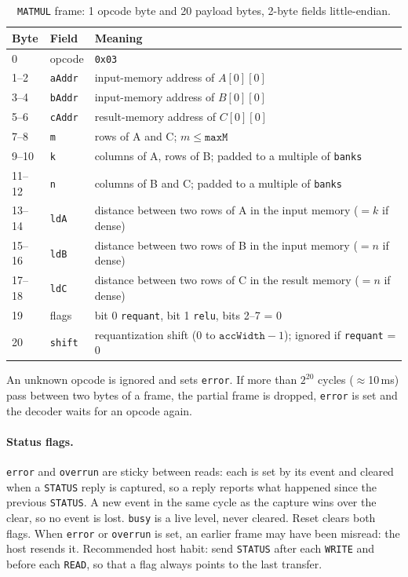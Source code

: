 \documentclass{article}
\begin{document}
\begin{table}[h]
\small\renewcommand{\arraystretch}{1.2}
\begin{tabularx}{\linewidth}{@{} l l Y @{}}
  \toprule
  \textbf{Byte} & \textbf{Field} & \textbf{Meaning} \\
        & opcode & \texttt{0x03} \\
  1--2   & \texttt{aAddr} & input-memory address of $A[0][0]$ \\
  3--4   & \texttt{bAddr} & input-memory address of $B[0][0]$ \\
  5--6   & \texttt{cAddr} & result-memory address of $C[0][0]$ \\
  7--8   & \texttt{m}     & rows of A and C; $m \le \texttt{maxM}$ \\
  9--10  & \texttt{k}     & columns of A, rows of B; padded to a multiple of \texttt{banks} \\
  11--12 & \texttt{n}     & columns of B and C; padded to a multiple of \texttt{banks} \\
  13--14 & \texttt{ldA}   & distance between two rows of A in the input memory ($= k$ if dense) \\
  15--16 & \texttt{ldB}   & distance between two rows of B in the input memory ($= n$ if dense) \\
  17--18 & \texttt{ldC}   & distance between two rows of C in the result memory ($= n$ if dense) \\
  19     & flags          & bit 0 \texttt{requant}, bit 1 \texttt{relu}, bits 2--7 = 0 \\
  20     & \texttt{shift} & requantization shift ($0$ to $\texttt{accWidth}-1$); ignored if \texttt{requant} = 0 \\
  \bottomrule
\end{tabularx}
\caption{\texttt{MATMUL} frame: 1 opcode byte and 20 payload bytes, 2-byte fields little-endian.}
\label{tab:matmul-frame}
\end{table}

An unknown opcode is ignored and sets \texttt{error}. If more than $2^{20}$ cycles ($\approx$10\,ms) pass between two bytes of a frame, the partial frame is dropped, \texttt{error} is set and the decoder waits for an opcode again.

\paragraph{Status flags.}
\texttt{error} and \texttt{overrun} are sticky between reads: each is set by its event and cleared
when a \texttt{STATUS} reply is captured, so a reply reports what happened since the previous
\texttt{STATUS}. A new event in the same cycle as the capture wins over the clear, so no event is
lost. \texttt{busy} is a live level, never cleared. Reset clears both flags.
When \texttt{error} or \texttt{overrun} is set, an earlier frame may have been misread: the host
resends it. Recommended host habit: send \texttt{STATUS} after each \texttt{WRITE} and before each
\texttt{READ}, so that a flag always points to the last transfer.
\end{document}

